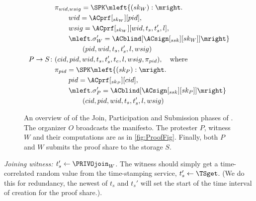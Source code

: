 \begin{figure}
\begin{minipage}{\linewidth}
\begin{align*}
        & \pi_{wid, wsig} = \SPK\mleft\{ (sk_W) : \mright. \\
        & \qquad wid = \ACprf[_{sk_W}][pid], \\
        & \qquad wsig = \ACprf[_{sk_W}][wid, t_s, t_s', l], \\
        & \qquad \mleft. \sigma_W' = \ACblind[\ACsign[_{ssk}][sk_W]]\mright\} \\
        & \qquad\qquad (pid, wid, t_s, t_s', l, wsig) \\
      P\to S\colon & (cid, pid, wid, t_s, t_s', t_e, l, wsig, \pi_{pid}),\quad 
      \text{where}\\
        & \pi_{pid} = \SPK\mleft\{ (sk_P) : \mright. \\
        & \qquad pid = \ACprf[_{sk_P}][cid], \\
        & \qquad \mleft. \sigma_P' = \ACblind[\ACsign[_{ssk}][sk_P]] \mright\} 
        \\
        & \qquad\qquad (cid, pid, wid, t_s, t_s', l, wsig)
    \end{align*}
  \end{minipage}
  \caption{%
    An overview of of the Join, Participation and Submission phases of \PRIVO.\@
    The organizer \(O\) broadcasts the manifesto.
    The protester \(P\), witness \(W\) and their computations are as in 
    \cref{fig:ProofFig}.
    Finally, both \(P\) and \(W\) submits the proof share to the storage \(S\).
  }%
  \label{fig:ProtocolOverview}
\end{figure}

\emph{Joining witness: \(t_s'\gets \PRIVOjoin_W\).}
The witness should simply get a time-correlated random value from the 
time-stamping service, \(t_s'\gets \TSget\).
(We do this for redundancy, the newest of \(t_s\) and \(t_s'\) will set the 
start of the time interval of creation for the proof share.).



